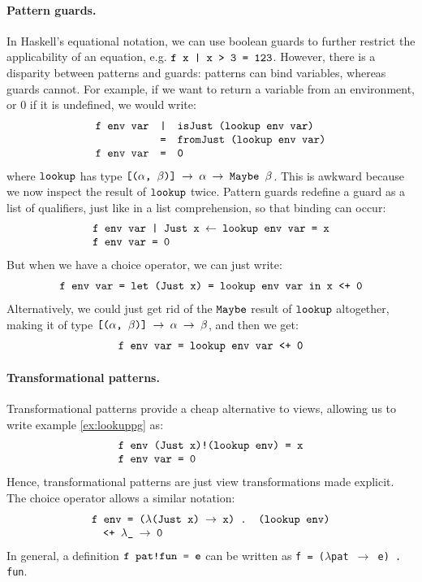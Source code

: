 \documentclass[fleqn]{article}
\newcommand{\ve}[1]{\ensuremath{\text{\tt #1}}}
\newcommand{\vve}[1]{{\tt #1}}
\newcommand{\ra}{\ensuremath{\rightarrow} }
\begin{document}
\paragraph{Pattern guards.}

In Haskell's equational notation, we can use boolean guards to further
restrict the applicability of an equation, e.g. \ve{f x | x > 3 =
  123}.  However, there is a disparity between patterns and guards:
patterns can bind variables, whereas guards cannot.  For example, if
we want to return a variable from an environment, or 0 if it is
undefined, we would write:
\[
\begin{array}{lll}
\ve{f env var} & \ve{|} & \ve{isJust (lookup env var)} \\
               & \ve{=} & \ve{fromJust (lookup env var)} \\
\ve{f env var} & \ve{=} & \ve{0}
\end{array}
\]
where \ve{lookup} has type \ve{[($\alpha$, $\beta$)] \ra $\alpha$ \ra
  Maybe $\beta$}.
This is awkward because we now inspect the result of \ve{lookup}
twice.  Pattern guards \cite{patternguards} redefine a guard as a
list of qualifiers, just like in a list comprehension, so that binding
can occur:
\begin{equation}
\label{ex:lookuppg}
\begin{array}{l}
\ve{f env var | Just x $\leftarrow$ lookup env var = x} \\
\ve{f env var = 0}
\end{array}
\end{equation}
But when we have a choice operator, we can just write:
\[
\begin{array}{l}
\ve{f env var = let (Just x) = lookup env var in x <+ 0} \\
\end{array}
\]
Alternatively, we could just get rid of the \ve{Maybe} result of \ve{lookup}
altogether, making it of type 
\ve{[($\alpha$, $\beta$)] \ra $\alpha$ \ra $\beta$}, and then we
get:
\[
\begin{array}{l}
\ve{f env var = lookup env var <+ 0} \\
\end{array}
\]


\paragraph{Transformational patterns.}

Transformational patterns \cite{patternguards} provide a cheap
alternative to views, allowing us to write example \ref{ex:lookuppg} as:
\[
\begin{array}{l}
\ve{f env (Just x)!(lookup env) = x} \\
\ve{f env var = 0}
\end{array}
\]
Hence, transformational patterns are just view transformations made
explicit.  
The choice operator allows a similar notation:
\[
\begin{array}{l}
\ve{f env = ($\lambda$(Just x) \ra x) . (lookup env)} \\
\quad \ve{<+ $\lambda$\_ \ra 0}
\end{array}
\]
In general, a definition \ve{f pat!fun = e} can be written as \vve{f =
  ($\lambda$pat \ra e) . fun}.
\end{document}
